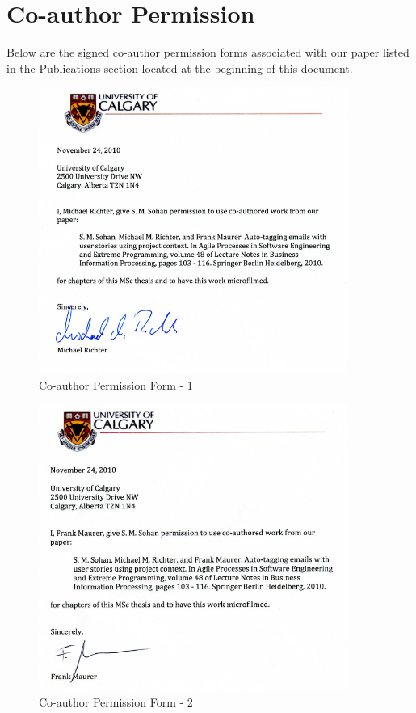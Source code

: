 \fancyhead[RO,LE]{\thepage}
\fancyfoot{} 
\chapter{Co-author Permission}

Below are the signed co-author permission forms associated with our paper listed in the Publications section located at the beginning of this document.

\pagebreak
\begin{figure}[!h]
	\centering
	\includegraphics[width=0.9\textwidth]{richter.png}
    \caption{Co-author Permission Form - 1}
	\label{fig:coauthor_1}
\end{figure}

\begin{figure}[!h]
	\centering
	\includegraphics[width=0.9\textwidth]{frank.png}
    \caption{Co-author Permission Form - 2}
	\label{fig:coauthor_2}
\end{figure}



